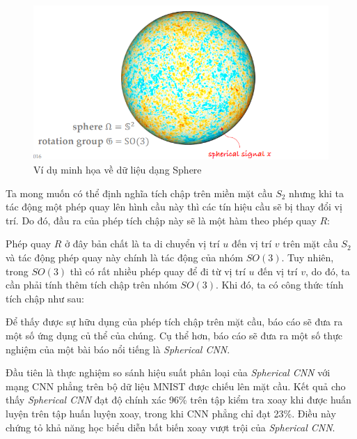 \begin{figure}[H]
    \centering
    \includegraphics[width=0.7\linewidth]{Images/GDL/sphere_conv/sphere_img.png}
    \caption{Ví dụ minh họa về dữ liệu dạng Sphere\cite{geometricdeep2022}}
\end{figure}

Ta mong muốn có thể định nghĩa tích chập trên miền mặt cầu $S_2$ nhưng khi ta tác động một phép quay lên hình cầu này thì các tín hiệu cầu sẽ bị thay đổi vị trí. Do đó, đầu ra của phép tích chập này sẽ là một hàm theo phép quay $R$:
\begin{center}
\end{center}

Phép quay $R$ ở đây bản chất là ta di chuyển vị trí $u$ đến vị trí $v$ trên mặt cầu $S_2$ và tác động phép quay này chính là tác động của nhóm $SO(3)$. Tuy nhiên, trong $SO(3)$ thì có rất nhiều phép quay để đi từ vị trí $u$ đến vị trí $v$, do đó, ta cần phải tính thêm tích chập trên nhóm $SO(3)$. Khi đó, ta có công thức tính tích chập như sau:

\begin{center}
\end{center}

Để thấy được sự hữu dụng của phép tích chập trên mặt cầu, báo cáo sẽ đưa ra một số ứng dụng củ thể của chúng. Cụ thể hơn, báo cáo sẽ đưa ra một số thực nghiệm của một bài báo nổi tiếng là \textit{Spherical CNN}\cite{cohen2018sphericalcnns}.

Đầu tiên là thực nghiệm so sánh hiệu suất phân loại của \textit{Spherical CNN} với mạng CNN phẳng trên bộ dữ liệu MNIST được chiếu lên mặt cầu. Kết quả cho thấy \textit{Spherical CNN} đạt độ chính xác 96\% trên tập kiểm tra xoay khi được huấn luyện trên tập huấn luyện xoay, trong khi CNN phẳng chỉ đạt 23\%\cite{cohen2018sphericalcnns}. Điều này chứng tỏ khả năng học biểu diễn bất biến xoay vượt trội của \textit{Spherical CNN}.

